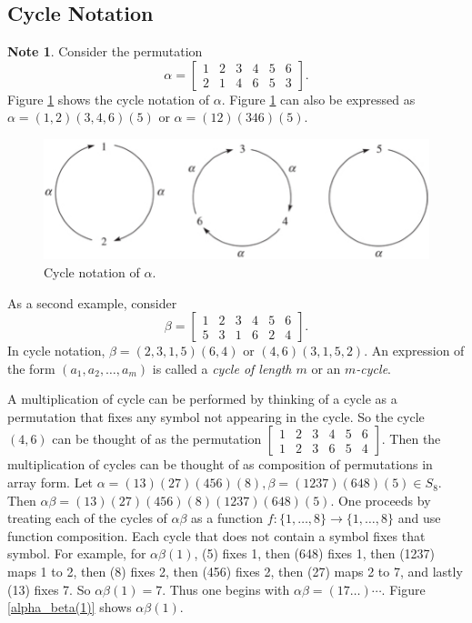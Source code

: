 \documentclass{article}
\theoremstyle{definition}
\newtheorem{note}{Note}[section]
\begin{document}
 \subsection{Cycle Notation}
 \begin{note}
    Consider the permutation
 \begin{equation*}
     \alpha =
     \begin{bmatrix}
         1 & 2 & 3 & 4 & 5 & 6 \\
         2 & 1 & 4 & 6 & 5 & 3
     \end{bmatrix}.
 \end{equation*}
 Figure \ref{cycle_notation} shows the cycle notation of $\alpha$. Figure \ref{cycle_notation} can also be expressed as $\alpha = (1,2)(3,4,6)(5)$ or $\alpha = (12)(346)(5)$.
 \begin{figure}[!htbp]
     \centering
     \includegraphics[width=0.7\linewidth]{figures/cycle_notation.png}
     \caption{Cycle notation of $\alpha$.}
     \label{cycle_notation}
 \end{figure}
 
 As a second example, consider
 \begin{equation*}
     \beta =
     \begin{bmatrix}
         1 & 2 & 3 & 4 & 5 & 6 \\
         5 & 3 & 1 & 6 & 2 & 4
     \end{bmatrix}.
 \end{equation*}
 In cycle notation, $\beta = (2,3,1,5)(6,4)$ or $(4,6)(3,1,5,2)$. An expression of the form $(a_1,a_2,\dots,a_m)$ is called a \textit{cycle of length $m$} or an \textit{$m$-cycle}.
 
 A multiplication of cycle can be performed by thinking of a cycle as a permutation that fixes any symbol not appearing in the cycle. So the cycle $(4,6)$ can be thought of as the permutation $\begin{bmatrix}
     1 & 2 & 3 & 4 & 5 & 6 \\
     1 & 2 & 3 & 6 & 5 & 4
 \end{bmatrix}$.
 Then the multiplication of cycles can be thought of as composition of permutations in array form. Let $\alpha=(13)(27)(456)(8), \beta=(1237)(648)(5) \in S_8$. Then $\alpha\beta=(13)(27)(456)(8)(1237)(648)(5)$. One proceeds by treating each of the cycles of $\alpha\beta$ as a function $f:\{1,\dots,8\} \to \{1,\dots,8\}$ and use function composition. Each cycle that does not contain a symbol fixes that symbol. For example, for $\alpha\beta(1)$, (5) fixes 1, then (648) fixes 1, then (1237) maps 1 to 2, then (8) fixes 2, then (456) fixes 2, then (27) maps 2 to 7, and lastly (13) fixes 7. So $\alpha\beta(1)=7$. Thus one begins with $\alpha\beta=(17\dots)\cdots$. Figure \ref{alpha_beta(1)} shows $\alpha\beta(1)$.
 

\end{note}
\end{document}
